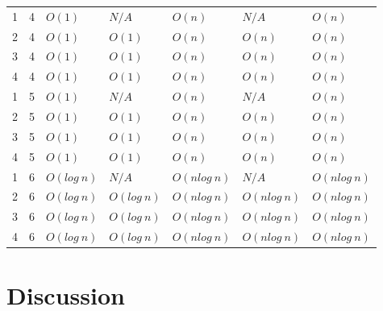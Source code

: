 \documentclass[12pt]{article}
\begin{document}
\begin{center}
\begin{tabularx}{\linewidth}{X X X X X X X}
        1 & 4 & $O(1)$      & $N/A$       & $O(n)$       & $N/A$        & $O(n)$       \\
        2 & 4 & $O(1)$      & $O(1)$      & $O(n)$       & $O(n)$       & $O(n)$       \\
        3 & 4 & $O(1)$      & $O(1)$      & $O(n)$       & $O(n)$       & $O(n)$       \\
        4 & 4 & $O(1)$      & $O(1)$      & $O(n)$       & $O(n)$       & $O(n)$       \\
        \hline

        1 & 5 & $O(1)$      & $N/A$       & $O(n)$       & $N/A$        & $O(n)$       \\
        2 & 5 & $O(1)$      & $O(1)$      & $O(n)$       & $O(n)$       & $O(n)$       \\
        3 & 5 & $O(1)$      & $O(1)$      & $O(n)$       & $O(n)$       & $O(n)$       \\
        4 & 5 & $O(1)$      & $O(1)$      & $O(n)$       & $O(n)$       & $O(n)$       \\
        \hline

        1 & 6 & $O(log\:n)$ & $N/A$       & $O(nlog\:n)$ & $N/A$        & $O(nlog\:n)$ \\
        2 & 6 & $O(log\:n)$ & $O(log\:n)$ & $O(nlog\:n)$ & $O(nlog\:n)$ & $O(nlog\:n)$ \\
        3 & 6 & $O(log\:n)$ & $O(log\:n)$ & $O(nlog\:n)$ & $O(nlog\:n)$ & $O(nlog\:n)$ \\
        4 & 6 & $O(log\:n)$ & $O(log\:n)$ & $O(nlog\:n)$ & $O(nlog\:n)$ & $O(nlog\:n)$
    \end{tabularx}
\end{center}

\pagebreak

\section{Discussion}
\end{document}
